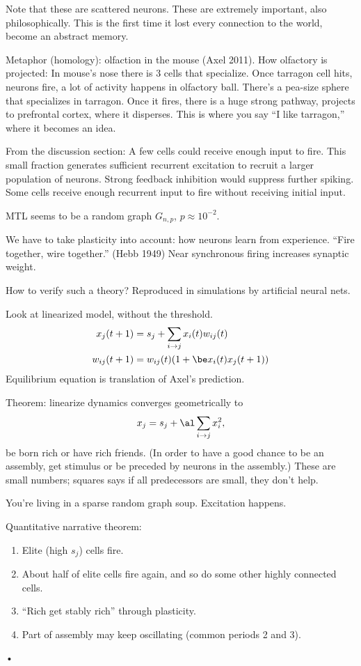 Note that these are scattered neurons. These are extremely important, also philosophically. This is the first time it lost every connection to the world, become an abstract memory.

Metaphor (homology): olfaction in the mouse (Axel 2011). How olfactory is projected: In mouse's nose there is 3 cells that specialize. Once tarragon cell hits, neurons fire, a lot of activity happens in olfactory ball. There's a pea-size sphere that specializes in tarragon. Once it fires, there is a huge strong pathway, projects to prefrontal cortex, where it disperses. This is where you say ``I like tarragon,'' where it becomes an idea.

From the discussion section: A few cells could receive enough input to fire. This small fraction generates sufficient recurrent excitation to recruit a larger population of neurons. Strong feedback inhibition would suppress further spiking. Some cells receive enough recurrent input to fire without receiving initial input.

MTL seems to be a random graph $G_{n,p}$, $p\approx 10^{-2}$. %

We have to take plasticity into account: how neurons learn from experience. ``Fire together, wire together.'' (Hebb 1949) Near synchronous firing increases synaptic weight.

How to verify such a theory? Reproduced in simulations by artificial neural nets.

Look at linearized model, without the threshold. 
\begin{align}
x_j(t+1) &=s_j + \sum_{i\to j} x_i(t)w_{ij}(t)\\
w_{ij}(t+1) &= w_{ij}(t) (1+\be x_i(t) x_j(t+1))
\end{align}
Equilibrium equation is translation of Axel's prediction.

Theorem: linearize dynamics converges geometrically to 
$$
x_j = s_j + \al\sum_{i\to j} x_i^2,
$$
be born rich or have rich friends. (In order to have a good chance to be an assembly, get stimulus or be preceded by neurons in the assembly.) These are small numbers; squares says if all predecessors are small, they don't help.


You're living in a sparse random graph soup. Excitation happens. 

Quantitative narrative theorem:
\begin{enumerate}
\item
Elite (high $s_j$) cells fire.
\item
About half of elite cells fire again, and so do some other highly connected cells.
\item
``Rich get stably rich'' through plasticity.
\item
Part of assembly may keep oscillating (common periods 2 and 3).
\end{enumerate}•

